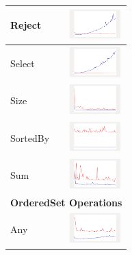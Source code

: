 \begin{longtable}{ m{2.5cm} m{8cm} m{2cm} }
Reject &

&
\includegraphics[width=2cm]{../graphs/bag/small/Reject}
\\\hline

Select &

&
\includegraphics[width=2cm]{../graphs/bag/small/Select}
\\\hline

Size &

&
\includegraphics[width=2cm]{../graphs/bag/small/Size}
\\\hline

SortedBy &

&
\includegraphics[width=2cm]{../graphs/bag/small/sortedBy}
\\\hline

Sum &

&
\includegraphics[width=2cm]{../graphs/bag/small/Sum}
\\\hline
 
 \multicolumn{3}{c}{{\bf OrderedSet Operations}}\\\hline
 
 Any &
  
  & 
  	\includegraphics[width=2cm]{../graphs/orderedset/small/Any}
  \\\hline
  

\end{longtable}
